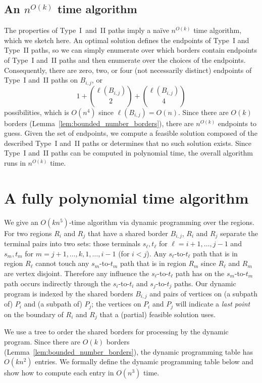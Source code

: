 \documentclass[11pt,twoside]{article}
\newcommand{\border}[2]{B_{#1,#2}}
\newcommand{\len}[1]{\ell(#1)}
\begin{document}
\subsection{An $n^{O(k)}$ time algorithm}

The properties of Type~I~and~II paths imply a na\"ive $n^{O(k)}$ time algorithm, which we sketch here.
An optimal solution defines the endpoints of Type~I and Type~II paths, so we can simply enumerate over which borders contain endpoints of Type~I and~II paths and then enumerate over the choices of the endpoints.  
Consequently, there are zero, two, or four (not necessarily distinct) endpoints of Type~I and~II paths on $\border{i}{j}$, or
\[
1 + {\len{\border{i}{j}} \choose 2} + {\len{\border{i}{j}} \choose 4}
\]
possibilities, which is $O(n^4)$ since $\len{\border{i}{j}} = O(n)$.  Since there are $O(k)$ borders (Lemma~\ref{lem:bounded_number_borders}), there are $n^{O(k)}$ endpoints to guess.  Given the set of endpoints, we compute a feasible solution composed of the described Type~I and~II paths or determines that no such solution exists.  Since Type~I and~II paths can be computed in polynomial time, the overall 
algorithm runs in $n^{O(k)}$ time.




\section{A fully polynomial time algorithm}

We give an $O(kn^5)$-time algorithm via dynamic programming over the regions.  For two regions $R_i$ and $R_j$ that have a shared border $B_{i,j}$, $R_i$ and $R_j$ separate the terminal pairs into two sets: those terminals $s_\ell,t_\ell$ for $\ell = i+1,\ldots, j-1$ and $s_m,t_m$ for $m = j+1, \ldots, k, 1, \ldots, i-1$ (for $i < j$).  Any $s_\ell$-to-$t_\ell$ path that is in region $R_\ell$ cannot touch any $s_m$-to-$t_m$ path that is in region $R_m$ since $R_\ell$ and $R_m$ are vertex disjoint.  Therefore any influence the $s_\ell$-to-$t_\ell$ path has on the $s_m$-to-$t_m$ path occurs indirectly through the $s_i$-to-$t_i$ and $s_j$-to-$t_j$ paths.  Our dynamic program is indexed by the shared borders $B_{i,j}$ and pairs of vertices on (a subpath of) $P_i$ and (a subpath of) $P_j$; the vertices on $P_i$ and $P_j$ will indicate a {\em last point} on the boundary of $R_i$ and $R_j$ that a (partial) feasible solution uses. 

We use a tree to order the shared borders for processing by the dynamic program. Since there are $O(k)$ borders (Lemma~\ref{lem:bounded_number_borders}), the dynamic programming table has $O(k n^2)$ entries.  We formally define the dynamic programming table below and show how to compute each entry in $O(n^3)$ time.
\end{document}
